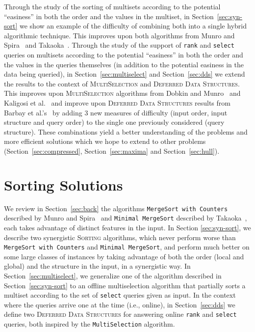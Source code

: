 Through the study of the sorting of multisets according to the
potential ``easiness'' in both the order and the values in the
multiset, in Section~\ref{sec:syn-sort} we show an example of the
difficulty of combining both into a single hybrid algorithmic
technique. This improves upon both algorithms from Munro and
Spira~\cite{1976-JComp-SortingAndSearchingInMultisets-MunroSpira} and
Takaoka~\cite{2009-Chapter-PartialSolutionAndEntropy-Takaoka}.
%
Through the study of the support of \texttt{rank} and \texttt{select}
queries on multisets according to the potential ``easiness'' in both
the order and the values in the queries themselves (in addition to the
potential easiness in the data being queried), in
Section~\ref{sec:multiselect} and Section~\ref{sec:dds} we extend the
results to the context of \textsc{MultiSelection} and \textsc{Deferred
  Data Structures}. This improves upon \textsc{MultiSelection}
algorithms from Dobkin and
Munro~\cite{1981-JACM-OptimalTimeMinimalSpaceSelectionAlgorithms-DobkinMunro}
and Kaligosi et
al.~\cite{2005-ICALP-TowardsOptimalMultopleSelection-KaligosiMehlhornMunroSanders}
and improve upon \textsc{Deferred Data
  Structures} results from Barbay et al.'s~\cite{2016-JDA-NearOptimalOnlineMultiselectionInInternalAndExternalMemory-BarbayGuptaRaoSorenson}
by adding 3 new measures of difficulty (input order, input structure
and query order) to the single one previously considered (query
structure). These combinations yield a better
understanding of the problems and more efficient solutions which we
hope to extend to other problems (Section~\ref{sec:compressed},
Section~\ref{sec:maxima} and Section~\ref{sec:hull}).

\section{Sorting Solutions}
\label{sec:sort}

We review in Section~\ref{sec:back} the algorithms \texttt{MergeSort
  with Counters} described by Munro and
Spira~\cite{1976-JComp-SortingAndSearchingInMultisets-MunroSpira} and
\texttt{Minimal MergeSort} described by
Takaoka~\cite{2009-Chapter-PartialSolutionAndEntropy-Takaoka}, each
takes advantage of distinct features in the input. In Section
\ref{sec:syn-sort}, we describe two synergistic \textsc{Sorting}
algorithms, which never perform worse than \texttt{MergeSort with
  Counters} and \texttt{Minimal MergeSort}, and perform much better on
some large classes of instances by taking advantage of both the order
(local and global) and the structure in the input, in a synergistic
way. In Section~\ref{sec:multiselect}, we generalize one of the
algorithm described in Section~\ref{sec:syn-sort} to an offline
multiselection algorithm that partially sorts a multiset according to
the set of \texttt{select} queries given as input. In the context
where the queries arrive one at the time (i.e., online), in
Section~\ref{sec:dds} we define two \textsc{Deferred Data Structures}
for answering online \texttt{rank} and \texttt{select} queries, both
inspired by the \texttt{MultiSelection} algorithm.

